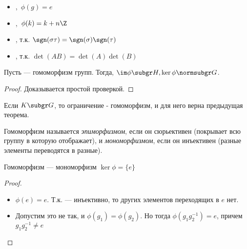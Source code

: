 \begin{examples}
  \theoremlistshack
  \begin{itemize}
    \item {},\ $\phi(g)=e$
    \item {},\ $\phi(k)=k+n\Z$
    \item {}, т.\:к. $\sgn(\sigma\tau)=\sgn(\sigma)\sgn(\tau)$
    \item {}, т.\:к. $\det(AB)=\det(A)\det(B)$
  \end{itemize}
\end{examples}

\begin{theorem}
  Пусть  --- гомоморфизм групп. Тогда, $\im\phi\subgr H, \ker\phi\normsubgr G$.
\end{theorem}
\begin{proof}
  Доказывается простой проверкой.
\end{proof}

\begin{remark}
  Если $K\subgr G$, то ограничение  - гомоморфизм, и для него верна предыдущая теорема.
\end{remark}

\begin{definition}
  Гомоморфизм называется \emph{эпиморфизмом}, если он сюрьективен (покрывает всю группу в которую отображает), и \emph{мономорфизмом}, если он инъективен (разные элементы переводятся в разные).
\end{definition}

\begin{theorem}
  Гомоморфизм --- мономорфизм \iff $\ker\phi=\{e\}$
\end{theorem}
\begin{proof}
  \theoremlistshack
  \begin{itemize}
    \item[\thus] $\phi(e)=e$. Т.\:к. \phi --- инъективно, то других элементов переходящих в $e$ нет.
    \item[\because] Допустим это не так, и $\phi(g_1)=\phi(g_2)$. Но тогда $\phi(g_1g_2^{-1})=e$, причем $g_1g_2^{-1}\neq e$
  \end{itemize}
\end{proof}

